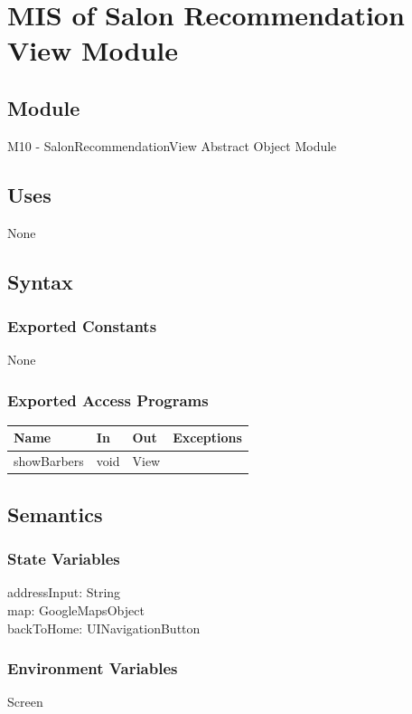 \documentclass[12pt, titlepage]{article}
\begin{document}
\newpage
\section{MIS of Salon Recommendation View Module} \label{Module}
\subsection{Module}
M10 - SalonRecommendationView
Abstract Object Module

\subsection{Uses}
None

\subsection{Syntax}
\subsubsection{Exported Constants}
None

\subsubsection{Exported Access Programs}
\begin{center}
\begin{tabular}{p{4cm} p{3cm} p{4cm} p{4cm}}
\hline
\textbf{Name} & \textbf{In} & \textbf{Out} & \textbf{Exceptions} \\
\hline
showBarbers & void & View &  \\
\hline
\end{tabular}
\end{center}

\subsection{Semantics}

\subsubsection{State Variables}
addressInput: String \\
map: GoogleMapsObject \\
backToHome: UINavigationButton

\subsubsection{Environment Variables}
Screen 
\end{document}
